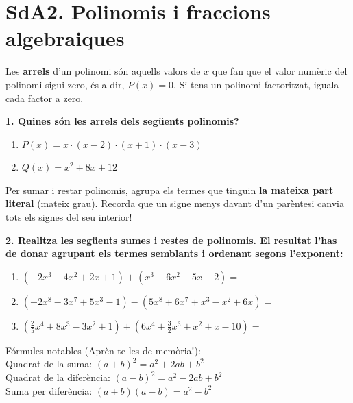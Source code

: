 \documentclass[12pt,a4paper]{article}
\begin{document}
\newpage
\section*{SdA2. Polinomis i fraccions algebraiques}

\begin{capsula}
Les \textbf{arrels} d'un polinomi són aquells valors de $x$ que fan que el valor numèric del polinomi sigui zero, és a dir, $P(x)=0$. Si tens un polinomi factoritzat, iguala cada factor a zero.
\end{capsula}

\textbf{1. Quines són les arrels dels següents polinomis?}
\begin{enumerate}[label=\alph*)]
    \item $P(x) = x \cdot (x - 2) \cdot (x + 1) \cdot (x - 3)$ \vspace{1cm}
    \item $Q(x) = x^2 + 8x + 12$ \vspace{2cm}
\end{enumerate}

\begin{capsula}
Per sumar i restar polinomis, agrupa els termes que tinguin \textbf{la mateixa part literal} (mateix grau). Recorda que un signe menys davant d'un parèntesi canvia tots els signes del seu interior!
\end{capsula}

\textbf{2. Realitza les següents sumes i restes de polinomis. El resultat l’has de donar agrupant els termes semblants i ordenant segons l’exponent:}
\begin{enumerate}[label=\alph*)]
    \item $(-2x^3 - 4x^2 + 2x + 1) + (x^3 - 6x^2 - 5x + 2) =$ \vspace{1.5cm}
    \item $(-2x^8 - 3x^7 + 5x^3 - 1) - (5x^8 + 6x^7 + x^3 - x^2 + 6x) =$ \vspace{1.5cm}
    \item $\left(\frac{2}{5}x^4 + 8x^3 - 3x^2 + 1\right) + \left(6x^4 + \frac{3}{2}x^3 + x^2 + x - 10\right) =$ \vspace{1.5cm}
\end{enumerate}

\begin{capsula}
Fórmules notables (Aprèn-te-les de memòria!): \\
Quadrat de la suma: $(a + b)^2 = a^2 + 2ab + b^2$ \\
Quadrat de la diferència: $(a - b)^2 = a^2 - 2ab + b^2$ \\
Suma per diferència: $(a + b)(a - b) = a^2 - b^2$
\end{capsula}
\end{document}
